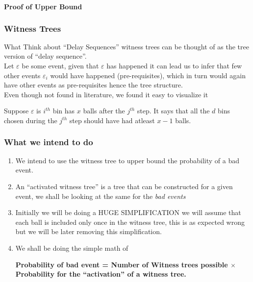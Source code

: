 \documentclass{beamer}
\begin{document}
\begin{frame}
\begin{center}
 \textbf{Proof of Upper Bound}
\end{center}

\end{frame}

\begin{frame}
\frametitle{Witness Trees}
\begin{block}
{What}
Think about ``Delay Sequences'' witness trees can be thought of as the tree version of ``delay sequence''. \\
Let $\varepsilon$ be some event, given that $\varepsilon$ has happened it can lead us to infer that few other events $\varepsilon_i$ would have happened (pre-requisites), which in turn would again have other events as pre-requisites hence the tree structure. \\
Even though not found in literature, we found it easy to visualize it 
\end{block}
\begin{example}
Suppose $\varepsilon$ is $i^{th}$ bin has $x$ balls after the $j^{th}$ step. It says that all the $d$ bins chosen during the $j^{th}$ step should have had atleast $x-1$ balls.
\end{example}
\end{frame}

\begin{frame}
\frametitle{What we intend to do}
\begin{enumerate}
\item We intend to use the witness tree to upper bound the probability of a bad event. 
\item An ``activated witness tree'' is a tree that can be constructed for a given event, we shall be looking at the same for the \textit{bad events} 
\item Initially we will be doing a HUGE SIMPLIFICATION we will assume that each ball is included only once in the witness tree, this is as expected wrong but we will be later removing this simplification. 
\item We shall be doing the simple math of 
\begin {center}
 \textbf{Probability of bad event = Number of Witness trees possible $\times$ Probability for the ``activation'' of a witness tree.}
\end {center}


\end{enumerate}


\end{frame}
\end{document}
